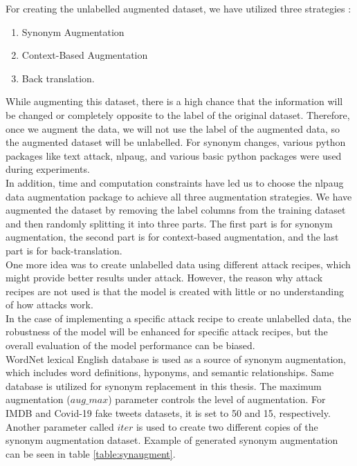 \documentclass[%
	BCOR=8mm, %
	DIV=12,
	toc=bibliography, %
	toc=listof, %
	oneside, %
	egregdoesnotlikesansseriftitles, %
	]{scrbook}
\begin{document}
For creating the unlabelled augmented dataset, we have utilized three strategies :
\begin{enumerate}
\item  Synonym Augmentation
\item Context-Based Augmentation
\item Back translation.
\end{enumerate}
While augmenting this dataset, there is a high chance that the information will be changed or completely opposite to the label of the original dataset. Therefore, once we augment the data, we will not use the label of the augmented data, so the augmented dataset will be unlabelled. For synonym changes, various python packages like text attack, nlpaug, and various basic python packages were used during experiments.\\
In addition, time and computation constraints have led us to choose the nlpaug data augmentation package \cite{ma_nlpaug_2022} to achieve all three augmentation strategies. We have augmented the dataset by removing the label columns from the training dataset and then randomly splitting it into three parts. The first part is for synonym augmentation, the second part is for context-based augmentation, and the last part is for back-translation.\\
One more idea was to create unlabelled data using different attack recipes, which might provide better results under attack. However, the reason why attack recipes are not used is that the model is created with little or no understanding of how attacks work. \\
In the case of implementing a specific attack recipe to create unlabelled data,  the robustness of the model will be enhanced for specific attack recipes, but the overall evaluation of the model performance can be biased.\\
WordNet lexical English database \cite{miller_wordnet_1995} is used as a source of synonym augmentation, which includes word definitions, hyponyms, and semantic relationships. Same database is utilized for synonym replacement in this thesis. The maximum augmentation ($aug\_max$) parameter controls the level of augmentation. For IMDB and Covid-19  fake tweets datasets, it is set to 50 and 15, respectively. Another parameter called $iter$ is used to create two different copies of the synonym augmentation dataset. Example of generated synonym augmentation can be seen in table \ref{table:synaugment}.\\
\end{document}
